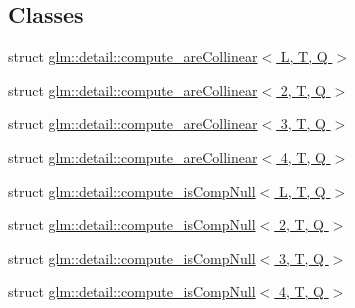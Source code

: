 \subsection*{Classes}
\begin{DoxyCompactItemize}
\item 
struct \hyperlink{structglm_1_1detail_1_1compute__areCollinear}{glm\+::detail\+::compute\+\_\+are\+Collinear$<$ L, T, Q $>$}
\item 
struct \hyperlink{structglm_1_1detail_1_1compute__areCollinear_3_012_00_01T_00_01Q_01_4}{glm\+::detail\+::compute\+\_\+are\+Collinear$<$ 2, T, Q $>$}
\item 
struct \hyperlink{structglm_1_1detail_1_1compute__areCollinear_3_013_00_01T_00_01Q_01_4}{glm\+::detail\+::compute\+\_\+are\+Collinear$<$ 3, T, Q $>$}
\item 
struct \hyperlink{structglm_1_1detail_1_1compute__areCollinear_3_014_00_01T_00_01Q_01_4}{glm\+::detail\+::compute\+\_\+are\+Collinear$<$ 4, T, Q $>$}
\item 
struct \hyperlink{structglm_1_1detail_1_1compute__isCompNull}{glm\+::detail\+::compute\+\_\+is\+Comp\+Null$<$ L, T, Q $>$}
\item 
struct \hyperlink{structglm_1_1detail_1_1compute__isCompNull_3_012_00_01T_00_01Q_01_4}{glm\+::detail\+::compute\+\_\+is\+Comp\+Null$<$ 2, T, Q $>$}
\item 
struct \hyperlink{structglm_1_1detail_1_1compute__isCompNull_3_013_00_01T_00_01Q_01_4}{glm\+::detail\+::compute\+\_\+is\+Comp\+Null$<$ 3, T, Q $>$}
\item 
struct \hyperlink{structglm_1_1detail_1_1compute__isCompNull_3_014_00_01T_00_01Q_01_4}{glm\+::detail\+::compute\+\_\+is\+Comp\+Null$<$ 4, T, Q $>$}
\end{DoxyCompactItemize}
